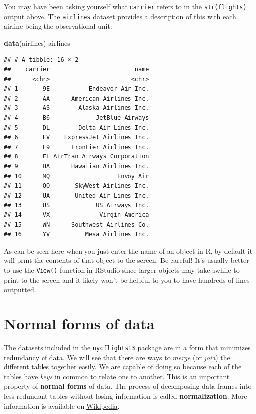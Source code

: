 \documentclass[]{tufte-book}
\newenvironment{Shaded}{\begin{snugshade}}{\end{snugshade}}
\newcommand{\KeywordTok}[1]{\textcolor[rgb]{0.13,0.29,0.53}{\textbf{{#1}}}}
\newcommand{\NormalTok}[1]{{#1}}
\begin{document}
You may have been asking yourself what \texttt{carrier} refers to in the
\texttt{str(flights)} output above. The \texttt{airlines} dataset
provides a description of this with each airline being the observational
unit:

\begin{Shaded}
\begin{Highlighting}[]
\KeywordTok{data}\NormalTok{(airlines)}
\NormalTok{airlines}
\end{Highlighting}
\end{Shaded}

\begin{verbatim}
## # A tibble: 16 × 2
##    carrier                        name
##      <chr>                       <chr>
## 1       9E           Endeavor Air Inc.
## 2       AA      American Airlines Inc.
## 3       AS        Alaska Airlines Inc.
## 4       B6             JetBlue Airways
## 5       DL        Delta Air Lines Inc.
## 6       EV    ExpressJet Airlines Inc.
## 7       F9      Frontier Airlines Inc.
## 8       FL AirTran Airways Corporation
## 9       HA      Hawaiian Airlines Inc.
## 10      MQ                   Envoy Air
## 11      OO       SkyWest Airlines Inc.
## 12      UA       United Air Lines Inc.
## 13      US             US Airways Inc.
## 14      VX              Virgin America
## 15      WN      Southwest Airlines Co.
## 16      YV          Mesa Airlines Inc.
\end{verbatim}

As can be seen here when you just enter the name of an object in R, by
default it will print the contents of that object to the screen. Be
careful! It's usually better to use the \texttt{View()} function in
RStudio since larger objects may take awhile to print to the screen and
it likely won't be helpful to you to have hundreds of lines outputted.

\section{Normal forms of data}\label{normal-forms-of-data}

The datasets included in the \texttt{nycflights13} package are in a form
that minimizes redundancy of data. We will see that there are ways to
\emph{merge} (or \emph{join}) the different tables together easily. We
are capable of doing so because each of the tables have \emph{keys} in
common to relate one to another. This is an important property of
\textbf{normal forms} of data. The process of decomposing data frames
into less redundant tables without losing information is called
\textbf{normalization}. More information is available on
\href{https://en.wikipedia.org/wiki/Database_normalization}{Wikipedia}.
\end{document}
